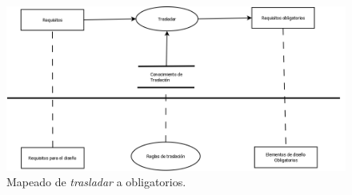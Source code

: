 \begin{itemize}
  \begin{figure}[H]
    \centering
    \includegraphics[scale=0.30]{imaxes/TrasladarObligatorios.png}
    \caption{\label{fig:TrasladarObligatorios}Mapeado de \textit{trasladar} a obligatorios.}
  \end{figure}
\end{itemize}




